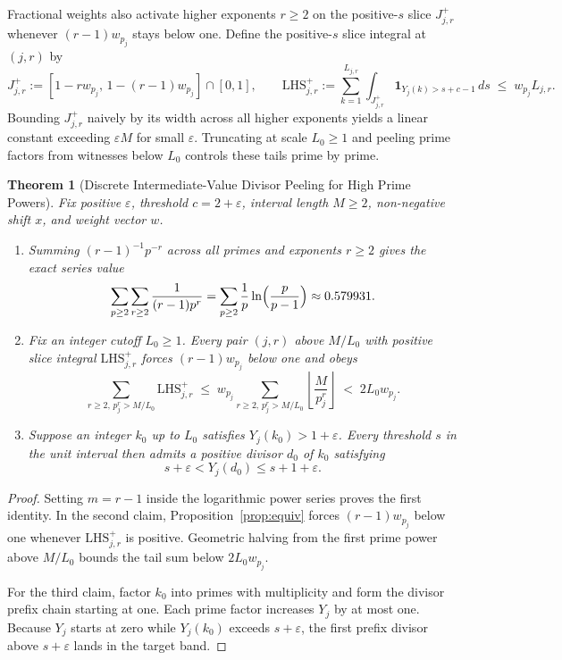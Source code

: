 \documentclass[11pt]{article}
\newtheorem{theorem}{Theorem}
\begin{document}
Fractional weights also activate higher exponents $r \ge 2$ on the positive-$s$ slice $J_{j, r}^+$ whenever $(r - 1) w_{p_j}$ stays below one. Define the positive-$s$ slice integral at $(j, r)$ by
\[
J_{j, r}^+ := [1 - r w_{p_j},\, 1 - (r - 1) w_{p_j}] \cap [0, 1], \qquad \mathrm{LHS}_{j, r}^+ := \sum_{k = 1}^{L_{j, r}} \int_{J_{j, r}^+} \mathbf{1}_{Y_j(k) > s + c - 1}\,ds \;\le\; w_{p_j} L_{j, r}.
\]
Bounding $J_{j, r}^+$ naively by its width across all higher exponents yields a linear constant exceeding $\varepsilon M$ for small $\varepsilon$. Truncating at scale $L_0 \ge 1$ and peeling prime factors from witnesses below $L_0$ controls these tails prime by prime.

\begin{theorem}[Discrete Intermediate-Value Divisor Peeling for High Prime Powers]
\label{thm:peeldiv}
Fix positive $\varepsilon$, threshold $c = 2 + \varepsilon$, interval length $M \ge 2$, non-negative shift $x$, and weight vector $w$.
\begin{enumerate}
\item Summing $(r - 1)^{-1} p^{-r}$ across all primes and exponents $r \ge 2$ gives the exact series value
\[
\sum_{p \ge 2} \sum_{r \ge 2} \frac{1}{(r - 1) p^r} = \sum_{p \ge 2} \frac{1}{p} \ln\Bigl(\frac{p}{p - 1}\Bigr) \approx 0.579931.
\]
\item Fix an integer cutoff $L_0 \ge 1$. Every pair $(j, r)$ above $M / L_0$ with positive slice integral $\mathrm{LHS}_{j, r}^+$ forces $(r - 1) w_{p_j}$ below one and obeys
\[
\sum_{r \ge 2,\, p_j^r > M / L_0} \mathrm{LHS}_{j, r}^+ \;\le\; w_{p_j} \sum_{r \ge 2,\, p_j^r > M / L_0} \left\lfloor \frac{M}{p_j^r} \right\rfloor \;<\; 2 L_0 w_{p_j}.
\]
\item Suppose an integer $k_0$ up to $L_0$ satisfies $Y_j(k_0) > 1 + \varepsilon$. Every threshold $s$ in the unit interval then admits a positive divisor $d_0$ of $k_0$ satisfying
\[
s + \varepsilon < Y_j(d_0) \le s + 1 + \varepsilon.
\]
\end{enumerate}
\end{theorem}
\begin{proof}
Setting $m = r - 1$ inside the logarithmic power series proves the first identity. In the second claim, Proposition~\ref{prop:equiv} forces $(r - 1) w_{p_j}$ below one whenever $\mathrm{LHS}_{j, r}^+$ is positive. Geometric halving from the first prime power above $M / L_0$ bounds the tail sum below $2 L_0 w_{p_j}$.

For the third claim, factor $k_0$ into primes with multiplicity and form the divisor prefix chain starting at one. Each prime factor increases $Y_j$ by at most one. Because $Y_j$ starts at zero while $Y_j(k_0)$ exceeds $s + \varepsilon$, the first prefix divisor above $s + \varepsilon$ lands in the target band.
\end{proof}
\end{document}

